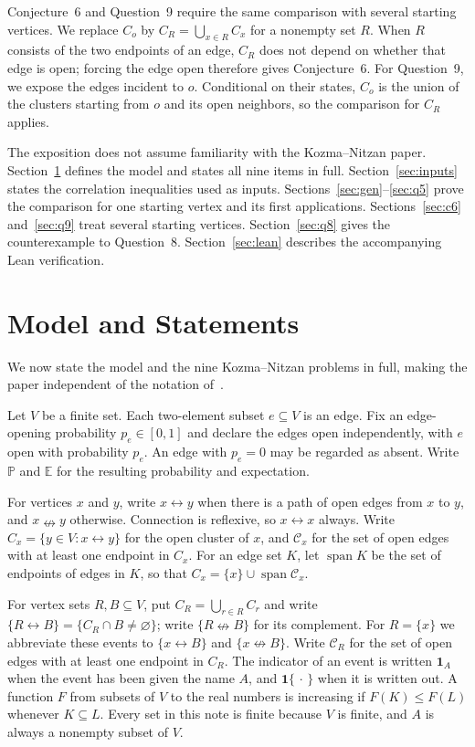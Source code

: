 \documentclass[11pt]{article}
\theoremstyle{definition}
\theoremstyle{remark}
\newcommand{\PP}{\mathbb P}
\newcommand{\EE}{\mathbb E}
\newcommand{\one}{\mathbf 1}
\newcommand{\con}{\leftrightarrow}
\newcommand{\ncon}{\nleftrightarrow}
\newcommand{\eC}{\mathcal C}
\DeclareMathOperator{\spn}{span}
\begin{document}
Conjecture~6 and Question~9 require the same comparison with several starting vertices.
We replace $C_o$ by $C_R=\bigcup_{x\in R}C_x$ for a nonempty set $R$. When $R$ consists
of the two endpoints of an edge, $C_R$ does not depend on whether that edge is open; forcing
the edge open therefore gives Conjecture~6. For Question~9, we expose the edges incident
to $o$. Conditional on their states, $C_o$ is the union of the clusters starting from $o$
and its open neighbors, so the comparison for $C_R$ applies.

The exposition does not assume familiarity with the Kozma--Nitzan paper. Section~\ref{sec:model}
defines the model and states all nine items in full. Section~\ref{sec:inputs} states the
correlation inequalities used as inputs. Sections~\ref{sec:gen}--\ref{sec:q5} prove the
comparison for one starting vertex and its first applications. Sections~\ref{sec:c6}
and~\ref{sec:q9} treat several starting vertices. Section~\ref{sec:q8} gives the
counterexample to Question~8. Section~\ref{sec:lean} describes the accompanying Lean
verification.

\section{Model and Statements}\label{sec:model}

We now state the model and the nine Kozma--Nitzan problems in full, making the paper
independent of the notation of~\cite{KN}.

Let $V$ be a finite set. Each two-element subset $e\subseteq V$ is an edge. Fix an
edge-opening probability $p_e\in[0,1]$ and declare the edges open independently, with $e$
open with probability $p_e$. An edge with $p_e=0$ may be regarded as absent. Write $\PP$
and $\EE$ for the resulting probability and expectation.

For vertices $x$ and $y$, write $x\con y$ when there is a path of open edges from $x$ to
$y$, and $x\ncon y$ otherwise. Connection is reflexive, so $x\con x$ always. Write
$C_x=\{y\in V:x\con y\}$ for the open cluster of $x$, and $\eC_x$ for the set of open edges
with at least one endpoint in $C_x$. For an edge set $K$, let $\spn K$ be the set of
endpoints of edges in $K$, so that $C_x=\{x\}\cup\spn\eC_x$.

For vertex sets $R,B\subseteq V$, put $C_R=\bigcup_{r\in R}C_r$ and write
$\{R\con B\}=\{C_R\cap B\neq\varnothing\}$; write $\{R\ncon B\}$ for its complement. For
$R=\{x\}$ we abbreviate these events to $\{x\con B\}$ and $\{x\ncon B\}$. Write $\eC_R$
for the set of open edges with at least one endpoint in $C_R$. The indicator of an
event is written $\one_A$ when the event has been given the name $A$, and
$\one\{\,\cdot\,\}$ when it is written out. A function $F$ from subsets of $V$ to the real
numbers is increasing if $F(K)\le F(L)$ whenever $K\subseteq L$. Every set in this note is
finite because $V$ is finite, and $A$ is always a nonempty subset of $V$.
\end{document}
